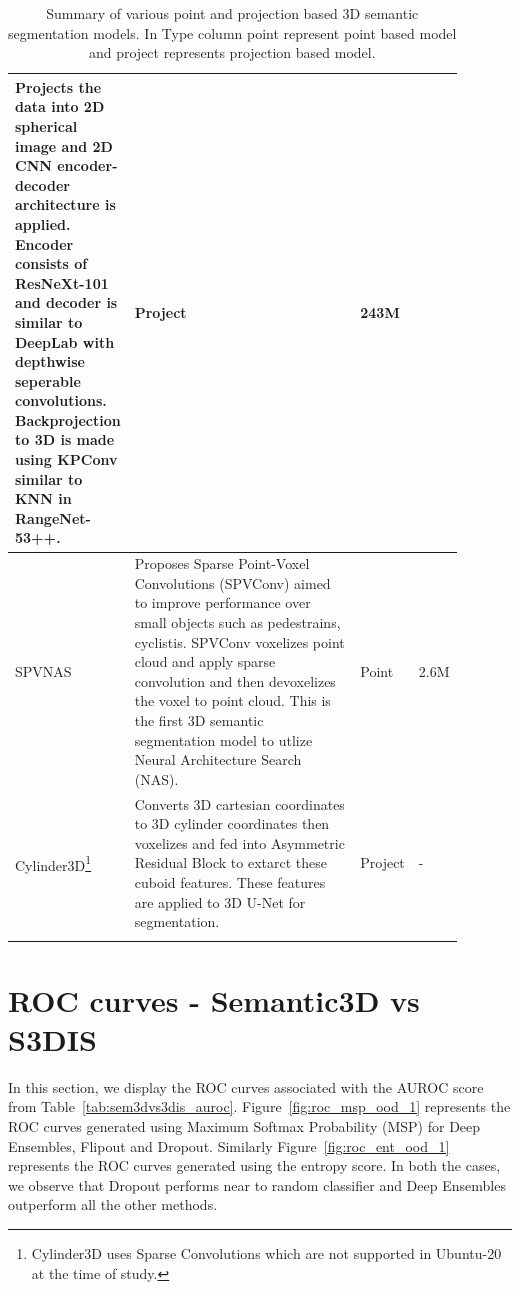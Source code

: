 \begin{longtable}{|p{0.15\linewidth} | p{0.59\linewidth}| p{0.06\linewidth} |p{0.09\linewidth}|}
            Projects the data into 2D spherical image and 2D CNN encoder-decoder architecture is applied.
            Encoder consists of ResNeXt-101 and decoder is similar to DeepLab with depthwise seperable convolutions.
            Backprojection to 3D is made using KPConv similar to KNN in RangeNet-53++.
            & Project & 243M \\
            \hline
            SPVNAS\cite{spvnas} &
            Proposes Sparse Point-Voxel Convolutions (SPVConv) aimed to improve performance over small objects such as pedestrains, cyclistis.
            SPVConv voxelizes point cloud and apply sparse convolution and then devoxelizes the voxel to point cloud.
            This is the first 3D semantic segmentation model to utlize Neural Architecture Search (NAS).
            & Point & 2.6M \\
            \hline
            Cylinder3D\cite{zhu2020cylindrical}\footnote{Cylinder3D uses Sparse Convolutions which are not supported in Ubuntu-20 at the time of study.} &
            Converts 3D cartesian coordinates to 3D cylinder coordinates then voxelizes and fed into Asymmetric Residual Block to extarct these cuboid features.
            These features are applied to 3D U-Net for segmentation.
            & Project & - \\
            \hline
            \caption{Summary of various point and projection based 3D semantic segmentation models. In Type column point represent point based model and project represents projection based model.}
            \label{tab:model_relatedwork}
    \end{longtable}
    
    \section{ROC curves - Semantic3D vs S3DIS}
    In this section, we display the ROC curves associated with the AUROC score from Table~\ref{tab:sem3dvs3dis_auroc}.
    Figure~\ref{fig:roc_msp_ood_1} represents the ROC curves generated using Maximum Softmax Probability (MSP) for Deep Ensembles, Flipout and Dropout.
    Similarly Figure~\ref{fig:roc_ent_ood_1} represents the ROC curves generated using the entropy score.
    In both the cases, we observe that Dropout performs near to random classifier and Deep Ensembles outperform all the other methods.

